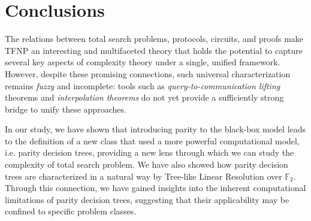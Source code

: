 \chapter*{Conclusions}


The relations between total search problems, protocols, circuits, and proofs make \textsf{TFNP} an interesting and multifaceted theory that holds the potential to capture several key aspects of complexity theory under a single, unified framework. However, despite these promising connections, such universal characterization remains \textit{fuzzy} and incomplete: tools such as \textit{query-to-communication lifting} theorems and \textit{interpolation theorems} do not yet provide a sufficiently strong bridge to unify these approaches.

In our study, we have shown that introducing parity to the black-box model leads to the definition of a new class that used a more powerful computational model, i.e. parity decision trees, providing a new lens through which we can study the complexity of total search problem. We have also showed how parity decision trees are characterized in a natural way by Tree-like Linear Resolution over $\mathbb{F}_2$. Through this connection, we have gained insights into the inherent computational limitations of parity decision trees, suggesting that their applicability may be confined to specific problem classes.

